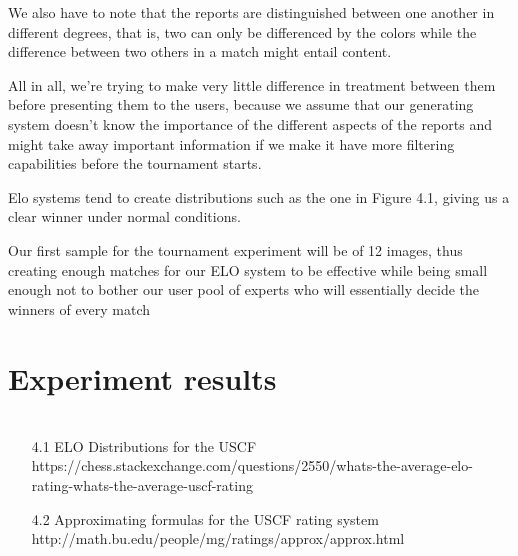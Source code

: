 We also have to note that the reports are distinguished between one another in different degrees, that is, two can only be differenced by the colors while the difference between two others in a match might entail content.

All in all, we're trying to make very little difference in treatment between them before presenting them to the users, because we assume that our generating system doesn't know the importance of the different aspects of the reports and might take away important information if we make it have more filtering capabilities before the tournament starts.


Elo systems tend to create distributions such as the one in Figure 4.1, giving us a clear winner under normal conditions.

Our first sample for the tournament experiment will be of 12 images, thus creating enough matches for our ELO system to be effective while being small enough not to bother our user pool of experts who will essentially decide the winners of every match

\section{Experiment results}
\label{cap4:sec:experimentresults}

\section*{\NotasBibliograficas}
\TocNotasBibliograficas
\begin{itemize}
\item [4.1] ELO Distributions for the USCF https://chess.stackexchange.com/questions/2550/whats-the-average-elo-rating-whats-the-average-uscf-rating 
\item [4.2] Approximating formulas for the USCF rating system http://math.bu.edu/people/mg/ratings/approx/approx.html
\end{itemize}

